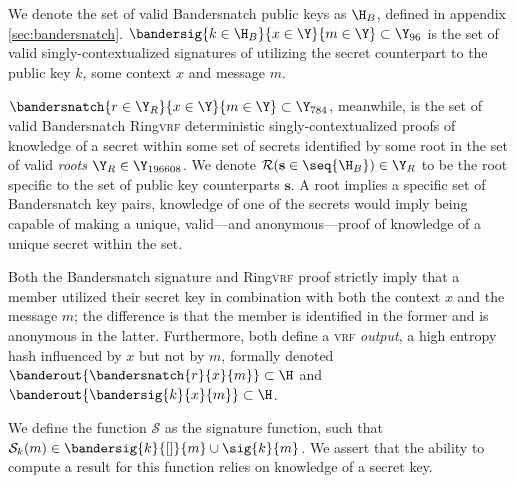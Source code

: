 We denote the set of valid Bandersnatch public keys as $\H_B$, defined in appendix \ref{sec:bandersnatch}. $\bandersig{k \in \H_B}{x \in \Y}{m \in \Y} \subset \Y_{96}$ is the set of valid singly-contextualized signatures of utilizing the secret counterpart to the public key $k$, some context $x$ and message $m$.

$\bandersnatch{r \in \Y_R}{x \in \Y}{m \in \Y} \subset \Y_{784}$, meanwhile, is the set of valid Bandersnatch Ring\textsc{vrf} deterministic singly-contextualized proofs of knowledge of a secret within some set of secrets identified by some root in the set of valid \emph{roots} $\Y_R \in \Y_{196608}$. We denote $\mathcal{R}(\mathbf{s} \in \seq{\H_B}) \in \Y_R$ to be the root specific to the set of public key counterparts $\mathbf{s}$. A root implies a specific set of Bandersnatch key pairs, knowledge of one of the secrets would imply being capable of making a unique, valid---and anonymous---proof of knowledge of a unique secret within the set.

Both the Bandersnatch signature and Ring\textsc{vrf} proof strictly imply that a member utilized their secret key in combination with both the context $x$ and the message $m$; the difference is that the member is identified in the former and is anonymous in the latter. Furthermore, both define a \textsc{vrf} \emph{output}, a high entropy hash influenced by $x$ but not by $m$, formally denoted $\banderout{\bandersnatch{r}{x}{m}} \subset \H$ and $\banderout{\bandersig{k}{x}{m}} \subset \H$.

We define the function $\mathcal{S}$ as the signature function, such that $\mathcal{S}_{k}(m) \in \bandersig{k}{[]}{m} \cup \sig{k}{m}$. We assert that the ability to compute a result for this function relies on knowledge of a secret key.
